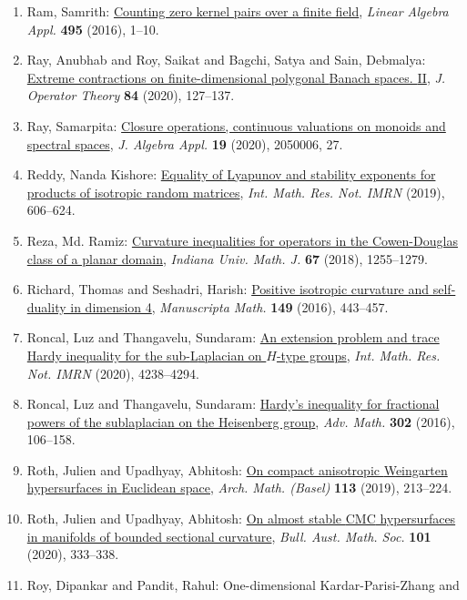 \begin{enumerate}
\item Ram, Samrith: \href{https://doi.org/10.1016/j.laa.2016.01.029}{Counting zero kernel pairs over a finite field}, \emph{Linear Algebra Appl.} {\bf 495} (2016), 1--10.
\item Ray, Anubhab and Roy, Saikat and Bagchi, Satya and Sain,
Debmalya: \href{https://doi.org/10.7900/jot}{Extreme contractions on finite-dimensional polygonal {B}anach
spaces. {II}}, \emph{J. Operator Theory} {\bf 84} (2020), 127--137.
\item Ray, Samarpita: \href{https://doi.org/10.1142/S0219498820500061}{Closure operations, continuous valuations on monoids and
spectral spaces}, \emph{J. Algebra Appl.} {\bf 19} (2020), 2050006, 27.
\item Reddy, Nanda Kishore: \href{https://doi.org/10.1093/imrn/rnx134}{Equality of {L}yapunov and stability exponents for products of
isotropic random matrices}, \emph{Int. Math. Res. Not. IMRN} {\bf } (2019), 606--624.
\item Reza, Md. Ramiz: \href{https://doi.org/10.1512/iumj.2018.67.7320}{Curvature inequalities for operators in the {C}owen-{D}ouglas
class of a planar domain}, \emph{Indiana Univ. Math. J.} {\bf 67} (2018), 1255--1279.
\item Richard, Thomas and Seshadri, Harish: \href{https://doi.org/10.1007/s00229-015-0790-2}{Positive isotropic curvature and self-duality in dimension 4}, \emph{Manuscripta Math.} {\bf 149} (2016), 443--457.
\item Roncal, Luz and Thangavelu, Sundaram: \href{https://doi.org/10.1093/imrn/rny137}{An extension problem and trace {H}ardy inequality for the
sub-{L}aplacian on {$H$}-type groups}, \emph{Int. Math. Res. Not. IMRN} {\bf } (2020), 4238--4294.
\item Roncal, Luz and Thangavelu, Sundaram: \href{https://doi.org/10.1016/j.aim.2016.07.010}{Hardy's inequality for fractional powers of the sublaplacian
on the {H}eisenberg group}, \emph{Adv. Math.} {\bf 302} (2016), 106--158.
\item Roth, Julien and Upadhyay, Abhitosh: \href{https://doi.org/10.1007/s00013-019-01315-8}{On compact anisotropic {W}eingarten hypersurfaces in
{E}uclidean space}, \emph{Arch. Math. (Basel)} {\bf 113} (2019), 213--224.
\item Roth, Julien and Upadhyay, Abhitosh: \href{https://doi.org/10.1017/s0004972719000935}{On almost stable {CMC} hypersurfaces in manifolds of bounded
sectional curvature}, \emph{Bull. Aust. Math. Soc.} {\bf 101} (2020), 333--338.
\item Roy, Dipankar and Pandit, Rahul: One-dimensional {K}ardar-{P}arisi-{Z}hang and

\end{enumerate}
